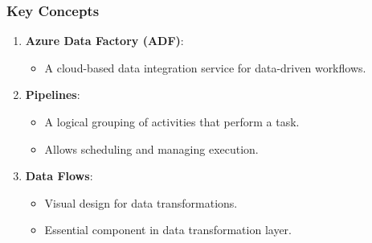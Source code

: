 \documentclass[aspectratio=169]{beamer}
\begin{document}
\begin{frame}[fragile]
    \frametitle{Key Concepts}

    \begin{enumerate}
        \item \textbf{Azure Data Factory (ADF)}:
            \begin{itemize}
                \item A cloud-based data integration service for data-driven workflows.
            \end{itemize}

        \item \textbf{Pipelines}:
            \begin{itemize}
                \item A logical grouping of activities that perform a task.
                \item Allows scheduling and managing execution.
            \end{itemize}

        \item \textbf{Data Flows}:
            \begin{itemize}
                \item Visual design for data transformations.
                \item Essential component in data transformation layer.
            \end{itemize}
    \end{enumerate}
\end{frame}
\end{document}
